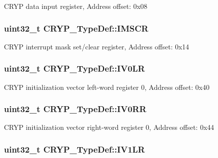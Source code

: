 C\-R\-Y\-P data input register, Address offset\-: 0x08 \hypertarget{struct_c_r_y_p___type_def_a3ee13f960f6631c574b1018c97f95925}{
\subsubsection[{I\-M\-S\-C\-R}]{ uint32\-\_\-t C\-R\-Y\-P\-\_\-\-Type\-Def\-::\-I\-M\-S\-C\-R}}\label{struct_c_r_y_p___type_def_a3ee13f960f6631c574b1018c97f95925}
C\-R\-Y\-P interrupt mask set/clear register, Address offset\-: 0x14 \hypertarget{struct_c_r_y_p___type_def_a3b9c6cf4e4ef58624504b08a5fc2242d}{
\subsubsection[{I\-V0\-L\-R}]{ uint32\-\_\-t C\-R\-Y\-P\-\_\-\-Type\-Def\-::\-I\-V0\-L\-R}}\label{struct_c_r_y_p___type_def_a3b9c6cf4e4ef58624504b08a5fc2242d}
C\-R\-Y\-P initialization vector left-\/word register 0, Address offset\-: 0x40 \hypertarget{struct_c_r_y_p___type_def_a4d6479478d84d3b85dcebb667ad963de}{
\subsubsection[{I\-V0\-R\-R}]{ uint32\-\_\-t C\-R\-Y\-P\-\_\-\-Type\-Def\-::\-I\-V0\-R\-R}}\label{struct_c_r_y_p___type_def_a4d6479478d84d3b85dcebb667ad963de}
C\-R\-Y\-P initialization vector right-\/word register 0, Address offset\-: 0x44 \hypertarget{struct_c_r_y_p___type_def_a8d837d2677d8ca1d8ed8bc018d6bb176}{
\subsubsection[{I\-V1\-L\-R}]{ uint32\-\_\-t C\-R\-Y\-P\-\_\-\-Type\-Def\-::\-I\-V1\-L\-R}}\label{struct_c_r_y_p___type_def_a8d837d2677d8ca1d8ed8bc018d6bb176}
